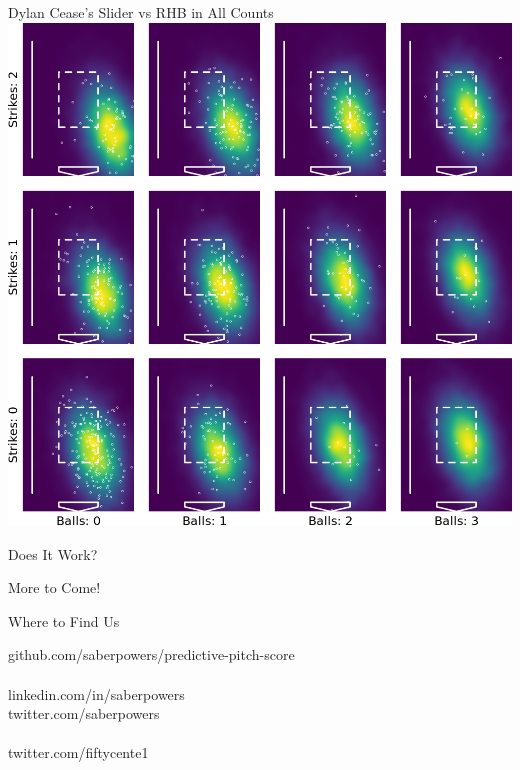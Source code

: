 \documentclass{beamer}
\begin{document}
  \begin{frame}{Dylan Cease's Slider vs RHB in All Counts}
    \vfill
    \centering
    \includegraphics[height = 0.85\textheight]{images/656302_SL_R_plate.png}
  \end{frame}

  \begin{frame}{Does It Work?}
  \end{frame}

  \begin{frame}{More to Come!}
  \end{frame}

  \begin{frame}{Where to Find Us}

    {\color{ricegray} github.com/}{\color{ricerichblue}saberpowers/predictive-pitch-score}\\
    ~\\
    {\color{ricegray} linkedin.com/in/}{\color{ricerichblue}saberpowers}\\
    {\color{ricegray} twitter.com/}{\color{ricerichblue}saberpowers}\\
    ~\\
    {\color{ricegray} twitter.com/}{\color{ricerichblue}fiftycente1}
  \end{frame}
\end{document}
